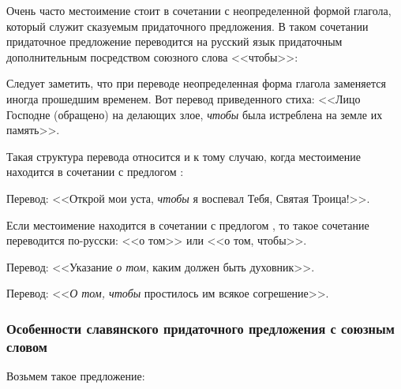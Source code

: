 \documentclass[11pt,a4paper,oneside]{memoir}
\begin{document}
    Очень часто местоимение {} стоит в сочетании с неопределенной формой глагола, который служит сказуемым придаточного предложения. В таком сочетании придаточное предложение переводится на русский язык придаточным дополнительным посредством союзного слова <<чтобы>>:
    
    \bigskip{}
    
    Следует заметить, что при переводе неопределенная форма глагола заменяется иногда прошедшим временем. Вот перевод приведенного стиха: <<Лицо Господне (обращено) на делающих злое, \emph{чтобы} была истреблена на земле их память>>.
    
    Такая структура перевода относится и к тому случаю, когда местоимение {} находится в сочетании с предлогом {}:
    
    \bigskip{}
    
    Перевод: <<Открой мои уста, \emph{чтобы} я воспевал Тебя, Святая Троица!>>.
    
    Если местоимение {\slv{}} находится в сочетании с предлогом {\slv{}}, то такое сочетание переводится по-русски: <<о том>> или <<о том, чтобы>>.
    
    \bigskip{}
    
    Перевод: <<Указание \emph{о том}, каким должен быть духовник>>.
    
    \bigskip{}
    
    Перевод: <<\emph{О том, чтобы} простилось им всякое согрешение>>.\medskip

                \subsubsection[Особенности славянского придаточного предложения]{Особенности славянского придаточного предложения с союзным словом {}}

    Возьмем такое предложение:
    
    \bigskip{}
    
\end{document}

